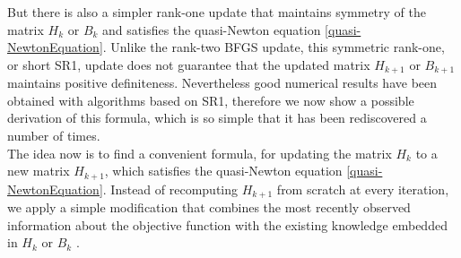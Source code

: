 But there is also a simpler rank-one update that maintains symmetry of the matrix $H_k$ or $B_k$ and satisfies the quasi-Newton equation \cref{quasi-NewtonEquation}. Unlike the rank-two BFGS update, this symmetric rank-one, or short SR1, update does not guarantee that the updated matrix $H_{k+1}$ or $B_{k+1}$ maintains positive definiteness. Nevertheless good numerical results have been obtained with algorithms based on SR1, therefore we now show a possible derivation of this formula, which is so simple that it has been rediscovered a number of times. \\


The idea now is to find a convenient formula, for updating the matrix $H_k$ to a new matrix $H_{k+1}$, which satisfies the quasi-Newton equation \cref{quasi-NewtonEquation}. Instead of recomputing $H_{k+1}$ from scratch at every iteration, we apply a simple modification that combines the most recently observed information about the objective function with the existing knowledge embedded in $H_k$ or $B_k$ \cite[p.~139]{NocedalWright:2006}. 



